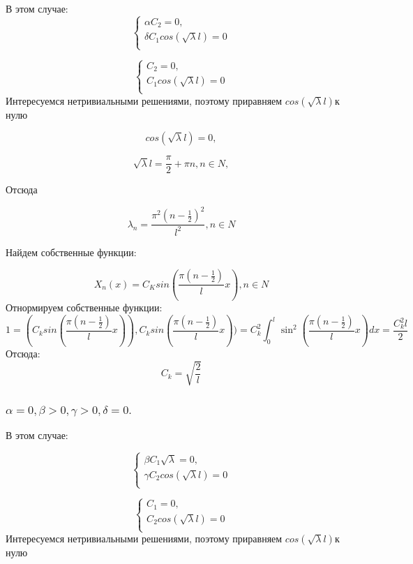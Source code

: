 \documentclass[12pt, a4paper]{report}
\begin{document}
В этом случае:
\begin{equation*}
 \begin{cases}
\alpha C_2=0, 
   \\
\delta C_1 cos (\sqrt{\lambda}l)=0
   \\  
 \end{cases}
\end{equation*}

\begin{equation*}
 \begin{cases}
C_2=0, 
   \\
C_1 cos (\sqrt{\lambda}l )=0
   \\  
 \end{cases}
\end{equation*}
Интересуемся нетривиальными решениями, поэтому приравняем $cos(\sqrt{\lambda}l ) $к нулю

\[cos(\sqrt{\lambda}l) =0,\]

\[\sqrt{\lambda}l = \frac{\pi}{2} +\pi n, n \in N,\]

Отсюда 

\[\lambda_n = \frac{\pi^2(n-\frac{1}{2})^2}{l^2}, n \in N\]

Найдем собственные функции:

\[X_n(x)=C_{K}sin(\frac{\pi(n-\frac{1}{2})}{l}x), n \in N\]
Отнормируем собственные функции:
\[1=(C_{k}sin(\frac{\pi(n-\frac{1}{2})}{l}x)), C_{k}sin(\frac{\pi(n-\frac{1}{2})}{l}x))=C_{k}^2 \int_{0}^{l} \sin^2(\frac{\pi(n-\frac{1}{2})}{l}x)dx=\frac{C_{k}^2l}{2}\]
Отсюда:
\[C_{k}=\sqrt{\frac{2}{l}}\]

\subsubsection{ $ \alpha = 0, \beta > 0, \gamma > 0, \delta = 0. $}

В этом случае:

\begin{equation*}
 \begin{cases}
\beta C_1 \sqrt{\lambda}=0, 
   \\
\gamma C_2 cos (\sqrt{\lambda}l )=0
   \\  
 \end{cases}
\end{equation*}

\begin{equation*}
 \begin{cases}
C_1=0, 
   \\
C_2 cos (\sqrt{\lambda}l )=0
   \\  
 \end{cases}
\end{equation*}
Интересуемся нетривиальными решениями, поэтому приравняем $cos(\sqrt{\lambda}l ) $к нулю
\end{document}
